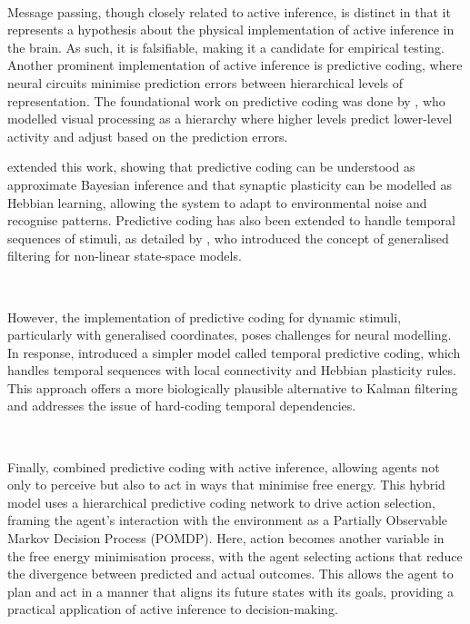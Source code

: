 \documentclass{article}
\begin{document}
\

Message passing, though closely related to active inference, is distinct in that it represents a hypothesis about the physical implementation of active inference in the brain. As such, it is falsifiable, making it a candidate for empirical testing. Another prominent implementation of active inference is predictive coding, where neural circuits minimise prediction errors between hierarchical levels of representation. The foundational work on predictive coding was done by \citet{rao1999predictive}, who modelled visual processing as a hierarchy where higher levels predict lower-level activity and adjust based on the prediction errors.
\

\citet{friston2005theory} extended this work, showing that predictive coding can be understood as approximate Bayesian inference and that synaptic plasticity can be modelled as Hebbian learning, allowing the system to adapt to environmental noise and recognise patterns. Predictive coding has also been extended to handle temporal sequences of stimuli, as detailed by \citet{friston2010filtering}, who introduced the concept of generalised filtering for non-linear state-space models.

\

However, the implementation of predictive coding for dynamic stimuli, particularly with generalised coordinates, poses challenges for neural modelling. In response, \citet{millidge2024temporal} introduced a simpler model called temporal predictive coding, which handles temporal sequences with local connectivity and Hebbian plasticity rules. This approach offers a more biologically plausible alternative to Kalman filtering and addresses the issue of hard-coding temporal dependencies.

\

Finally, \citet{millidge2019combining} combined predictive coding with active inference, allowing agents not only to perceive but also to act in ways that minimise free energy. This hybrid model uses a hierarchical predictive coding network to drive action selection, framing the agent's interaction with the environment as a Partially Observable Markov Decision Process (POMDP). Here, action becomes another variable in the free energy minimisation process, with the agent selecting actions that reduce the divergence between predicted and actual outcomes. This allows the agent to plan and act in a manner that aligns its future states with its goals, providing a practical application of active inference to decision-making.
\end{document}
